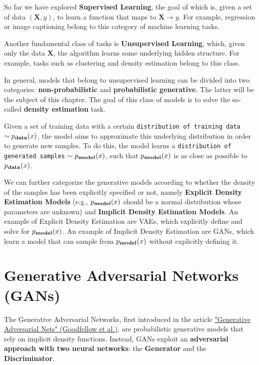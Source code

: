 So far we have explored \textbf{Supervised Learning}, the goal of which is, given a set of data \((\textbf{X}, y)\), to learn a function that maps to \(\textbf{X} \longrightarrow y\). For example, regression or image captioning belong to this category of machine learning tasks.

Another fundamental class of tasks is \textbf{Unsupervised Learning}, which, given only the data \(\textbf{X}\), the algorithm learns some underlying hidden structure. For example, tasks such as clustering and density estimation belong to this class.

In general, models that belong to unsupervised learning can be divided into two categories: \textbf{non-probabilistic} and \textbf{probabilistic generative}. The latter will be the subject of this chapter. The goal of this class of models is to solve the so-called \textbf{density estimation} task.

Given a set of training data with a certain \texttt{distribution of training data} \(\sim p_{\text{\textbf{data}}}(x)\), the model aims to approximate this underlying distribution in order to generate new samples. To do this, the model learns a \texttt{distribution of generated samples} \(\sim p_{\text{\textbf{model}}}(x)\), such that \(p_{\text{\textbf{model}}}(x)\) is as close as possible to \(p_{\text{\textbf{data}}}(x)\).

We can further categorize the generative models according to whether the density of the samples has been explicitly specified or not, namely \textbf{Explicit Density Estimation Models} (e.g., \(p_{\text{\textbf{model}}}(x)\) should be a normal distribution whose parameters are unknown) and \textbf{Implicit Density Estimation Models}. An example of Explicit Density Estimation are VAEs, which explicitly define and solve for \(p_{\text{\textbf{model}}}(x)\). An example of Implicit Density Estimation are GANs, which learn a model that can sample from \(p_{\text{\textbf{model}}}(x)\) without explicitly defining it.

\section{Generative Adversarial Networks (GANs)}

The Generative Adversarial Networks, first introduced in the article \href{https://arxiv.org/pdf/1406.2661}{"Generative Adversarial Nets" (Goodfellow et al.)}, are probabilistic generative models that rely on implicit density functions. Instead, GANs exploit an \textbf{adversarial approach with two neural networks}: the \textbf{Generator} and the \textbf{Discriminator}.

